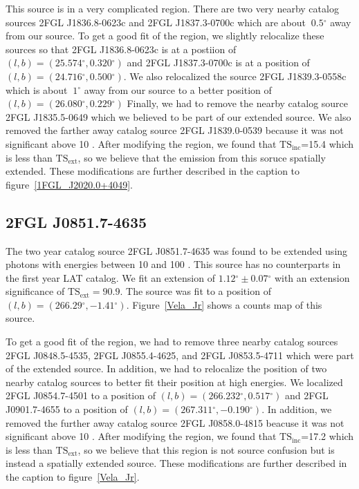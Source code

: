 \documentclass[12pt,preprint]{aastex}
\newcommand{\gev}{\text{GeV}\xspace}
\newcommand{\tsext}{{\ensuremath{\text{TS}_\text{ext}}}\xspace}
\newcommand{\tsinc}{\ensuremath{\text{TS}_\text{inc}}\xspace}
\renewcommand{\deg}{\ensuremath{^\circ}\xspace}
\begin{document}
This source is in a very complicated region. There are two very nearby
catalog sources 2FGL J1836.8-0623c and 2FGL J1837.3-0700c which are
about $~0.5\deg$ away from our source. To get a good fit of the region,
we slightly relocalize these sources so that 2FGL J1836.8-0623c is at
a postiion of $(l,b)=(25.574\deg,0.320\deg)$ and 2FGL J1837.3-0700c is
at a position of $(l,b)=(24.716\deg,0.500\deg)$.  We also relocalized
the source 2FGL J1839.3-0558c which is about $~1\deg$ away from our
source to a better position of $(l,b)=(26.080\deg,0.229\deg)$ Finally,
we had to remove the nearby catalog source 2FGL J1835.5-0649 which we
believed to be part of our extended source. We also removed the farther
away catalog source 2FGL J1839.0-0539 because it was not significant
above 10 \gev.  After modifying the region, we found that \tsinc=15.4
which is less than \tsext, so we believe that the emission from this
soruce spatially extended.  These modifications are further described
in the caption to figure~\ref{1FGL_J2020.0+4049}.



\subsection{2FGL J0851.7-4635}


The two year catalog source 2FGL J0851.7-4635 was found to be extended
using photons with energies between 10 \gev and 100 \gev. This source has
no counterparts in the first year LAT catalog.  We fit an extension of
$1.12\deg\pm0.07\deg$ with an extension significance of $\tsext=90.9$.
The source was fit to a position of $(l,b)=(266.29\deg,-1.41\deg)$.
Figure~\ref{Vela_Jr} shows a counts map of this source.

To get a good fit of the region, we had to remove three nearby catalog
sources 2FGL J0848.5-4535, 2FGL J0855.4-4625, and 2FGL J0853.5-4711 which
were part of the extended source.  In addition, we had to relocalize
the position of two nearby catalog sources to better fit their position
at high energies.  We localized 2FGL J0854.7-4501 to a position of
$(l,b)=(266.232\deg,0.517\deg)$ and 2FGL J0901.7-4655 to a position of
$(l,b)=(267.311\deg,-0.190\deg)$. In addition, we removed the further
away catalog source 2FGL J0858.0-4815 beacuse it was not significant
above 10 \gev.  After modifying the region, we found that \tsinc=17.2
which is less than \tsext, so we believe that this region is not source
confusion but is instead a spatially extended source.  These modifications
are further described in the caption to figure~\ref{Vela_Jr}.
\end{document}
